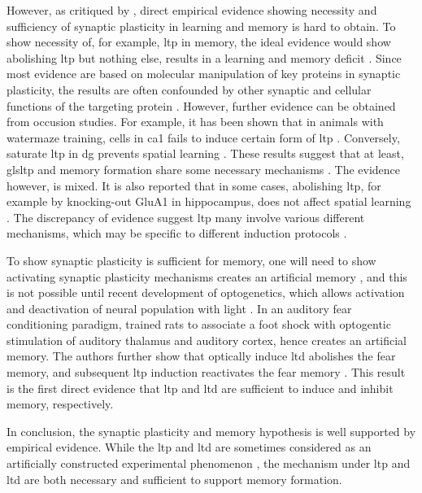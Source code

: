 However, as critiqued by \citet{neves08}, direct empirical evidence showing necessity and sufficiency of synaptic plasticity in learning and memory is hard to obtain. To show necessity of, for example, \gls{ltp} in memory, the ideal evidence would show abolishing \gls{ltp} but nothing else, results in a learning and memory deficit \citep{neves08}. Since most evidence are based on molecular manipulation of key proteins in synaptic plasticity, the results are often confounded by other synaptic and cellular functions of the targeting protein \citep{neves08}. However, further evidence can be obtained from occusion studies. For example, it has been shown that in animals with watermaze training, cells in \gls{ca1} fails to induce certain form of \gls{ltp} \citep{habib14}. Conversely, saturate \gls{ltp} in \gls{dg} prevents spatial learning \citep{moser98}. These results suggest that at least, gls{ltp} and memory formation share some necessary mechanisms \citep{takeuchi13}. The evidence however, is mixed. It is also reported that in some cases, abolishing \gls{ltp}, for example by knocking-out GluA1 in hippocampus, does not affect spatial learning \citep{zamanillo99}. The discrepancy of evidence suggest \gls{ltp} many involve various different mechanisms, which may be specific to different induction protocols \citep{neves08}.

To show synaptic plasticity is sufficient for memory, one will need to show activating synaptic plasticity mechanisms creates an artificial memory \citep{neves08}, and this is not possible until recent development of optogenetics, which allows activation and deactivation of neural population with light  \citep{zhang07, rajasethupathy16}. In an auditory fear conditioning paradigm, \citet{nabavi14} trained rats to associate a foot shock with optogentic stimulation of auditory thalamus and auditory cortex, hence creates an artificial memory. The authors further show that optically induce \gls{ltd} abolishes the fear memory, and subsequent \gls{ltp} induction reactivates the fear memory \citep{nabavi14}. This result is the first direct evidence that \gls{ltp} and \gls{ltd} are sufficient to induce and inhibit memory, respectively. 

In conclusion, the synaptic plasticity and memory hypothesis is well supported by empirical evidence. While the \gls{ltp} and \gls{ltd} are sometimes considered as an artificially constructed experimental phenomenon \citep{stevens98}, the mechanism under \gls{ltp} and \gls{ltd} are both necessary and sufficient to support memory formation.

